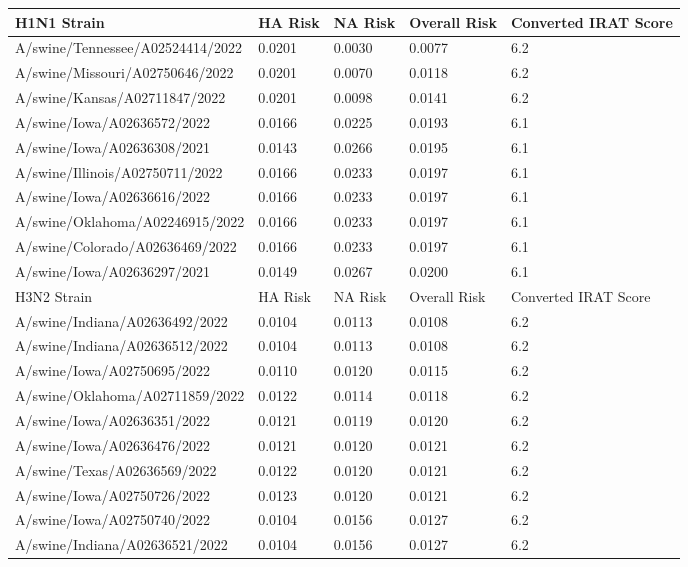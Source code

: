 \begin{tabular}{L{2.1in}|L{0.7in}|L{0.7in}|L{0.7in}|L{1in}}\hline
 H1N1 Strain & HA Risk & NA Risk & Overall Risk & Converted IRAT Score \\\hline
 A/swine/Tennessee/A02524414/2022 &0.0201&0.0030&0.0077&6.2\\\hline
 A/swine/Missouri/A02750646/2022 &0.0201&0.0070&0.0118&6.2\\\hline
 A/swine/Kansas/A02711847/2022 &0.0201&0.0098&0.0141&6.2\\\hline
 A/swine/Iowa/A02636572/2022 &0.0166&0.0225&0.0193&6.1\\\hline
 A/swine/Iowa/A02636308/2021 &0.0143&0.0266&0.0195&6.1\\\hline
 A/swine/Illinois/A02750711/2022 &0.0166&0.0233&0.0197&6.1\\\hline
 A/swine/Iowa/A02636616/2022 &0.0166&0.0233&0.0197&6.1\\\hline
 A/swine/Oklahoma/A02246915/2022 &0.0166&0.0233&0.0197&6.1\\\hline
 A/swine/Colorado/A02636469/2022 &0.0166&0.0233&0.0197&6.1\\\hline
 A/swine/Iowa/A02636297/2021 &0.0149&0.0267&0.0200&6.1\\\hline
 H3N2 Strain & HA Risk & NA Risk & Overall Risk & Converted IRAT Score\\\hline
 A/swine/Indiana/A02636492/2022 &0.0104&0.0113&0.0108&6.2\\\hline
 A/swine/Indiana/A02636512/2022 &0.0104&0.0113&0.0108&6.2\\\hline
 A/swine/Iowa/A02750695/2022 &0.0110&0.0120&0.0115&6.2\\\hline
 A/swine/Oklahoma/A02711859/2022 &0.0122&0.0114&0.0118&6.2\\\hline
 A/swine/Iowa/A02636351/2022 &0.0121&0.0119&0.0120&6.2\\\hline
 A/swine/Iowa/A02636476/2022 &0.0121&0.0120&0.0121&6.2\\\hline
 A/swine/Texas/A02636569/2022 &0.0122&0.0120&0.0121&6.2\\\hline
 A/swine/Iowa/A02750726/2022 &0.0123&0.0120&0.0121&6.2\\\hline
 A/swine/Iowa/A02750740/2022 &0.0104&0.0156&0.0127&6.2\\\hline
 A/swine/Indiana/A02636521/2022 &0.0104&0.0156&0.0127&6.2\\\hline
 \end{tabular}
